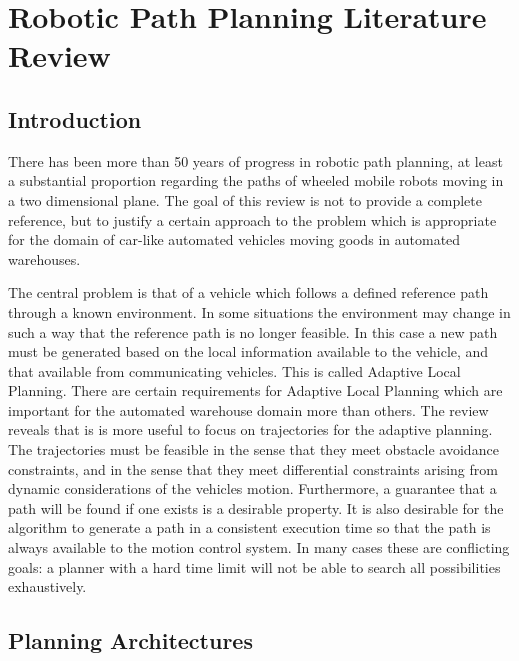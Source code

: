 \chapter{Robotic Path Planning Literature Review}


\section{Introduction}
There has been more than 50 years of progress in robotic path planning, at least a substantial proportion regarding the paths of wheeled mobile robots moving in a two dimensional plane. The goal of this review is not to provide a complete reference, but to justify a certain approach to the problem which is appropriate for the domain of car-like automated vehicles moving goods in automated warehouses.

The central problem is that of a vehicle which follows a defined reference path through a known environment. In some situations the environment may change in such a way that the reference path is no longer feasible. In this case a new path must be generated based on the local information available to the vehicle, and that available from communicating vehicles. This is called Adaptive Local Planning. There are certain requirements for Adaptive Local Planning which are important for the automated warehouse domain more than others. The review reveals that is is more useful to focus on trajectories for the adaptive planning. The trajectories must be feasible in the sense that they meet obstacle avoidance constraints, and in the sense that they meet differential constraints arising from dynamic considerations of the vehicles motion. Furthermore, a guarantee that a path will be found if one exists is a desirable property. It is also desirable for the algorithm to generate a path in a consistent execution time so that the path is always available to the motion control system. In many cases these are conflicting goals: a planner with a hard time limit will not be able to search all possibilities exhaustively. 

\section{Planning Architectures}

